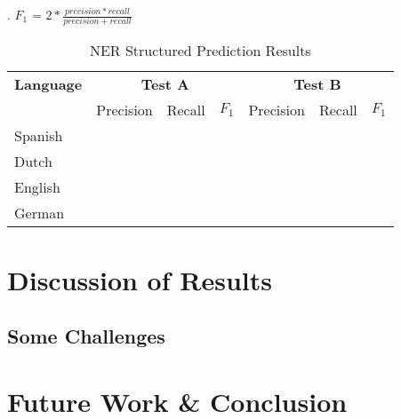 \documentclass[11pt]{article}
\begin{document}
\ex. $F_1$ = $ 2*\frac{precision *recall}{precision + recall}$ \label{F1}\\




\begin{table}[h!]
\scriptsize
\begin{tabular}{| l | l l l| l l l |}

\hline
\bf Language & \multicolumn{3}{c|}{ \bf Test A}&\multicolumn{3}{c|}{ \bf Test B}\\
             & Precision & Recall & $F_1$ & Precision & Recall & $F_1$ \\ \hline
Spanish &       &          &     &          &               & \\
Dutch  &         &          &     &          &               &   \\
English &        &          &     &          &               &       \\
German &      &          &       &          &             & \\
\hline
\end{tabular}
\caption{NER Structured Prediction Results }
\label{table:Results}
\end{table}

\section{Discussion of Results}

\subsection*{Some Challenges} %


\section{Future Work \& Conclusion}






\end{document}
